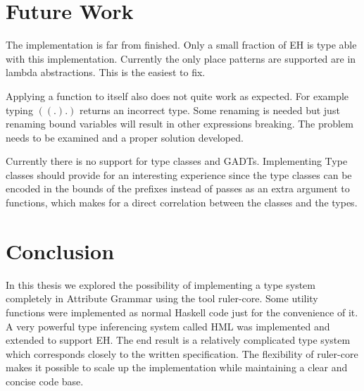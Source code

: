 \documentclass[twoside, titlepage, openright, a4paper]{book}
\begin{document}
\section{Future Work}
The implementation is far from finished. Only a small fraction of EH is type able with this implementation. Currently the only place patterns are supported are in lambda abstractions. This is the easiest to fix.

Applying a function to itself also does not quite work as expected. For example typing \ensuremath{((\mbox{.})\mbox{.})} returns an incorrect type. Some renaming is needed but just renaming bound variables will result in other expressions breaking. The problem needs to be examined and a proper solution developed.
 
Currently there is no support for type classes and GADTs. Implementing Type classes should provide for an interesting experience since the type classes can be encoded in the bounds of the prefixes instead of passes as an extra argument to functions, which makes for a direct correlation between the classes and the types.
\section{Conclusion}
In this thesis we explored the possibility of implementing a type system completely in Attribute Grammar using the tool ruler-core. Some utility functions were implemented as normal Haskell code just for the convenience of it. A very powerful type inferencing system called HML was implemented and extended to support EH. The end result is a relatively complicated type system which corresponds closely to the written specification. The flexibility of ruler-core makes it possible to scale up the implementation while maintaining a clear and concise code base.

\printglossaries
\printindex

\appendix
\end{document}
